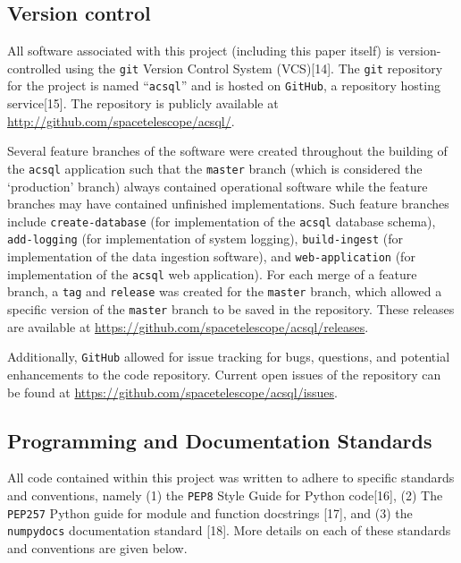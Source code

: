 \documentclass[10pt,journal,compsoc]{IEEEtran}
\begin{document}
\subsection{Version control} \label{sec3.1}

All software associated with this project (including this paper itself) is version-controlled using the \texttt{git} Version Control System (VCS)[14]. The \texttt{git} repository for the
project is named ``\texttt{acsql}'' and is hosted on \texttt{GitHub}, a repository hosting service[15].  The repository is publicly available at
\textcolor{blue}{\url{http://github.com/spacetelescope/acsql/}}.

Several feature branches of the software were created throughout the building of the \texttt{acsql} application such that the \texttt{master} branch (which is considered the
`production' branch) always contained operational software while the feature branches may have contained unfinished implementations.  Such feature branches include \texttt{create-database}
(for implementation of the \texttt{acsql} database schema), \texttt{add-logging} (for implementation of system logging), \texttt{build-ingest} (for implementation of the data
ingestion software), and \texttt{web-application} (for implementation of the \texttt{acsql} web application).  For each merge of a feature branch, a \texttt{tag} and \texttt{release}
was created for the \texttt{master} branch, which allowed a specific version of the \texttt{master} branch to be saved in the repository.  These releases are available at
\textcolor{blue}{\url{https://github.com/spacetelescope/acsql/releases}}.

Additionally, \texttt{GitHub} allowed for issue tracking for bugs, questions, and potential enhancements to the code repository.  Current open issues of the repository
can be found at \textcolor{blue}{\url{https://github.com/spacetelescope/acsql/issues}}.


\subsection{Programming and Documentation Standards} \label{sec3.2}

All code contained within this project was written to adhere to specific standards and conventions, namely (1) the \texttt{PEP8} Style Guide for Python code[16], (2) The
\texttt{PEP257} Python guide for module and function docstrings [17], and (3) the \texttt{numpydocs} documentation standard [18].  More details on each of these
standards and conventions are given below.
\end{document}
